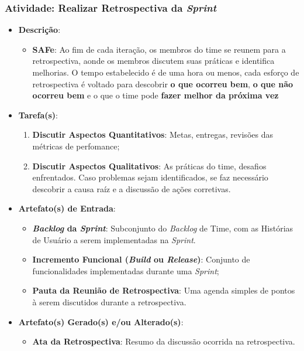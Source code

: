 			\subsubsection[Atividade: Realizar Retrospectiva da \emph{Sprint}]{Atividade: Realizar Retrospectiva da \emph{Sprint}}
			\label{subsubsec:processo_atividade_time_retrospectiva}
				\begin{itemize}
					\item{\textbf{Descrição}:
						\begin{itemize}
							\item{\textbf{SAFe}: Ao fim de cada iteração, os membros do time se reunem para a retrospectiva, aonde os membros discutem suas práticas e identifica melhorias. O tempo estabelecido é de uma hora ou menos, cada esforço de retrospectiva é voltado para descobrir \textbf{o que ocorreu bem}, \textbf{o que não ocorreu bem} e o que o time pode \textbf{fazer melhor da próxima vez}}
						\end{itemize}}
					\item{\textbf{Tarefa(s)}:
						\begin{enumerate}
							\item{\textbf{Discutir Aspectos Quantitativos}: Metas, entregas, revisões das métricas de perfomance;}
							\item{\textbf{Discutir Aspectos Qualitativos}: As práticas do time, desafios enfrentados. Caso problemas sejam identificados, se faz necessário descobrir a causa raíz e a discussão de ações corretivas.}
						\end{enumerate}}
					\item{\textbf{Artefato(s) de Entrada}:
						\begin{itemize}
							\item{\textbf{\emph{Backlog} da \emph{Sprint}}: Subconjunto do \emph{Backlog} de Time, com as Histórias de Usuário a serem implementadas na \emph{Sprint}.}
							\item{\textbf{Incremento Funcional (\emph{Build} ou \emph{Release})}: Conjunto de funcionalidades implementadas durante uma \emph{Sprint};}
							\item{\textbf{Pauta da Reunião de Retrospectiva}: Uma agenda simples de pontos à serem discutidos durante a retrospectiva.}
						\end{itemize}}
					\item{\textbf{Artefato(s) Gerado(s) e/ou Alterado(s)}:
						\begin{itemize}
							\item{\textbf{Ata da Retrospectiva}: Resumo da discussão ocorrida na retrospectiva.}

\end{itemize}}
\end{itemize}
